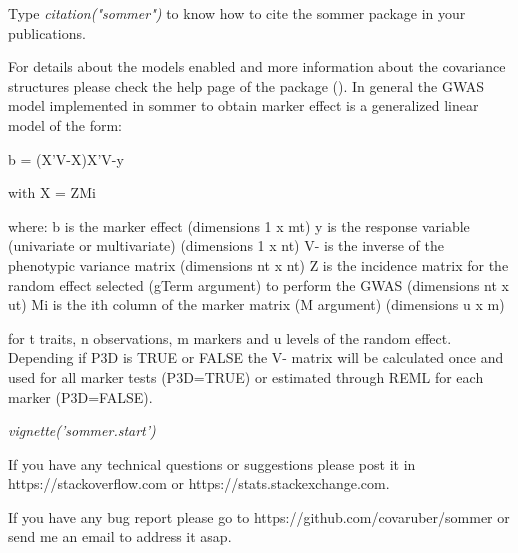 \documentclass[a4paper]{book}
\begin{document}
\begin{Details}\relax


Type \emph{citation("sommer")} to know how to cite the sommer package in your publications. 


For details about the models enabled and more information about the covariance structures please check the help page of the package (). In general the GWAS model implemented in sommer to obtain marker effect is a generalized linear model of the form:

b = (X'V-X)X'V-y

with X = ZMi

where:
b is the marker effect (dimensions 1 x mt)
y is the response variable (univariate or multivariate) (dimensions 1 x nt)
V- is the inverse of the phenotypic variance matrix (dimensions nt x nt)
Z is the incidence matrix for the random effect selected (gTerm argument) to perform the GWAS (dimensions nt x ut)
Mi is the ith column of the marker matrix (M argument) (dimensions u x m)

for t traits, n observations, m markers and u levels of the random effect. Depending if P3D is TRUE or FALSE the V- matrix will be calculated once and used for all marker tests (P3D=TRUE) or estimated through REML for each marker (P3D=FALSE).


\emph{vignette('sommer.start')}


If you have any technical questions or suggestions please post it in https://stackoverflow.com or https://stats.stackexchange.com. 

If you have any bug report please go to https://github.com/covaruber/sommer or send me an email to address it asap.

\end{Details}
%
\end{document}
